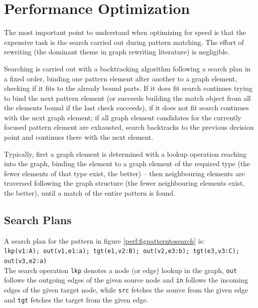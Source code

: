 \chapter{Performance Optimization}\label{cha:performance} 

The most important point to understand when optimizing for speed is that the expensive task is the search carried out during pattern matching. The effort of rewriting (the dominant theme in graph rewriting literature) is negligible.

Searching is carried out with a backtracking algorithm following a search plan in a fixed order, 
binding one pattern element after another to a graph element, checking if it fits to the already bound parts.
If it does fit search continues trying to bind the next pattern element (or succeeds building the match object from all the elements bound if the last check succeeds), if it does not fit search continues with the next graph element; if all graph element candidates for the currently focused pattern element are exhausted, search backtracks to the previous decision point and continues there with the next element.

Typically, first a graph element is determined with a lookup operation reaching into the graph, binding the element to a graph element of the required type (the fewer elements of that type exist, the better) -- then neighbouring elements are traversed following the graph structure (the fewer neighbouring elements exist, the better), until a match of the entire pattern is found.


\section{Search Plans}

A search plan for the pattern in figure \ref{perf:figpatterntosearch} is:\\
\texttt{lkp(v1:A); out(v1,e1:a); tgt(e1,v2:B); out(v2,e3:b); tgt(e3,v3:C); out(v3,e2:a)}\\
The search operation \texttt{lkp} denotes a node (or edge) lookup in the graph, \texttt{out} follows the outgoing edges of the given source node and \texttt{in} follows the incoming edges of the given target node, while \texttt{src} fetches the source from the given edge and \texttt{tgt} fetches the target from the given edge.

